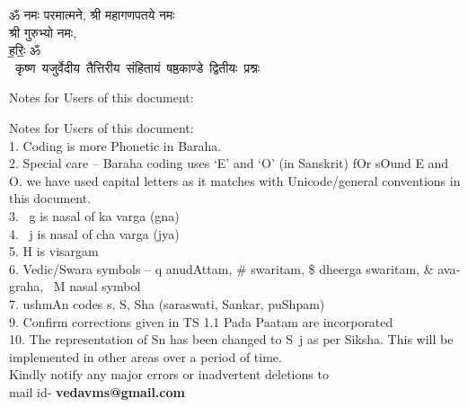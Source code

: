\begin{titlepage}
    \begin{center}
 
\begin{sanskrit}
    { \Large
    ॐ नमः परमात्मने, श्री महागणपतये नमः\\ 
    श्री गुरुभ्यो नमः,\\
     ह॒रिः॒ ॐ 
    }
    \\
    \vspace{2.5cm}
    \mbox{ \Large
    कृष्ण यजुर्वेदीय तैत्तिरीय संहितायं षष्ठकाण्डे द्वितीयः प्रश्नः 
    }
    
\end{sanskrit}
\end{center}

\end{titlepage}

\pagebreak

\begin{english}
    
    
    {
    
        Notes for Users of this document:\newline%
    
        Notes for Users of this document: \\
        1. Coding is more Phonetic in Baraha. \\
        2. Special care – Baraha coding uses ‘E’ and ‘O’ (in Sanskrit) fOr sOund E and O. we have used capital letters as it matches with Unicode/general conventions in this document. \\
        3. ~g is nasal of ka varga (gna) \\
        4. ~j is nasal of cha varga (jya) \\
        5. H is visargam \\
        6.  Vedic/Swara symbols – q anudAttam, \# swaritam, \$ dheerga swaritam, \& avagraha,  ~M nasal symbol \\
        7.  ushmAn codes s, S, Sha (saraswati, Sankar, puShpam) \\
        9. Confirm corrections given in TS 1.1 Pada Paatam are incorporated \\
        10. The representation of Sn has been changed to S~j as per Siksha. This will be implemented in other areas over a period of time. \\
    
    Kindly notify any major errors or inadvertent deletions to \\
    mail id- \textbf{vedavms@gmail.com}
    }
    \end{english}\par
\pagebreak

\tableofcontents

\pagebreak


